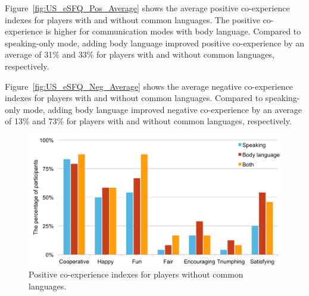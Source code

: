 


Figure~\ref{fig:US_eSFQ_Pos_Average} shows the average positive co-experience indexes for players with and without common languages. The positive co-experience is higher for communication modes with body language. Compared to speaking-only mode, adding body language 
improved positive co-experience by an average of 31\% and 33\% for players with and without common languages, respectively.

Figure~\ref{fig:US_eSFQ_Neg_Average} shows the average negative co-experience indexes for players with and without common languages. Compared to speaking-only mode, adding body language 
improved negative co-experience by an average of 13\% and 73\% for players with and without common languages, respectively.




\begin{figure}[!b]
\centering
\includegraphics[width=0.9\columnwidth]{Figures/US_Co-ex_Dif_Pos.pdf}
\caption{Positive co-experience indexes for players without common languages.}
\label{fig:US_Co-ex_Dif_Pos}
\end{figure}

